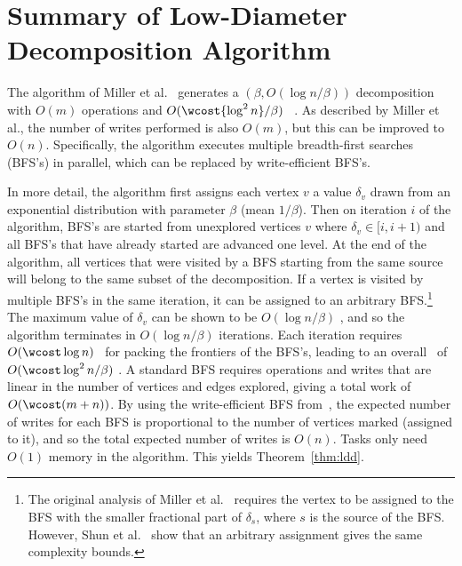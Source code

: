 
\section{Summary of Low-Diameter Decomposition Algorithm}\label{sec:appendix-cc}

 The algorithm of Miller et al.~\cite{miller2013parallel} generates a
$(\beta, O({\log n}/\beta))$ decomposition with $O(m)$ operations and
$O(\wcost{\log^2 n}/\beta)$ \depth\ \whp{}.  As described by Miller et
al., the number of writes performed is also $O(m)$, but this can be
improved to $O(n)$.  Specifically, the algorithm executes multiple
breadth-first searches (BFS's) in parallel, which can be replaced by
write-efficient BFS's.

In more detail, the algorithm first assigns each vertex $v$ a
value $\delta_v$ drawn from an exponential distribution with parameter
$\beta$ (mean $1/\beta$). Then on iteration $i$ of the algorithm,
BFS's are started from unexplored vertices $v$ where
$\delta_v \in [i,i+1)$ and all BFS's that have already started are
advanced one level. At the end of the algorithm, all vertices that
were visited by a BFS starting from the same source will belong to the
same subset of the decomposition. If a vertex is visited by multiple
BFS's in the same iteration, it can be assigned to an arbitrary
BFS.\footnote{The original analysis of Miller et
  al.~\cite{miller2013parallel} requires the vertex to be assigned to
  the BFS with the smaller fractional part of $\delta_s$, where $s$ is
  the source of the BFS. However, Shun et al.~\cite{Shun2014} show
  that an arbitrary assignment gives the same complexity bounds.}  The
maximum value of $\delta_v$ can be shown to be $O({\log n}/\beta)$
\whp{}, and so the algorithm terminates in $O(\log n/\beta)$
iterations. Each iteration requires $O(\wcost\log n)$ \depth\ for
packing the frontiers of the BFS's, leading to an overall \depth\ of
$O(\wcost\log^2 n/\beta)$ \whp{}. A standard BFS requires operations
and writes that are linear in the number of vertices and edges
explored, giving a total work of $O(\wcost(m+n))$.  By using the
write-efficient BFS from~\cite{BBFGGMS16}, the expected number of
writes for each BFS is proportional to the number of vertices marked
(assigned to it), and so the total expected number of writes is
$O(n)$. Tasks only need $O(1)$ \local{} memory in the algorithm.  This
yields Theorem~\ref{thm:ldd}.

